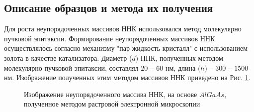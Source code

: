 \documentclass[a4paper,14pt,russian]{extreport}
\begin{document}
			\subsection{Описание образцов и метода их получения}\label{DescriptionOfDesordered}
				Для роста неупорядоченных массивов ННК использовался метод молекулярно пучковой эпитаксии. Формирование неупорядоченных массивов ННК осуществлялось согласно механизму "пар-жидкость-кристалл" с использованием золота в качестве катализатора. Диаметр ($d$) ННК, полученных методом молекулярно пучковой эпитаксии, составлял $20-60$ нм, длина ($h$) – $300-1500$ нм. Изображение полученных этим методом массивов ННК приведено на Рис. \ref{ris:desordrered}.
				\begin{figure}[H]
					\caption{Изображение неупорядоченного массива ННК, на основе $AlGaAs$, полученное методом растровой электронной микроскопии}
				\label{ris:desordrered}
				\end{figure}
\end{document}
